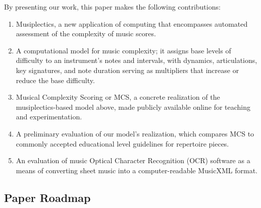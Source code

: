 \documentclass[10pt,preprint]{sigplanconf}
\begin{document}

By presenting our work, this paper makes the following contributions:

\begin{enumerate}
\item Musiplectics, a new application of computing that encompasses automated assessment of the complexity of music scores.
\item A computational model for music complexity; it assigns base levels of difficulty to an instrument's notes and intervals, with dynamics, articulations, key signatures, and note duration serving as multipliers that increase or reduce the base difficulty.
\item Musical Complexity Scoring or MCS, a concrete realization of the musiplectics-based model above, made publicly available online for teaching and experimentation.
\item A preliminary evaluation of our model's realization, which compares MCS to commonly accepted educational level guidelines for repertoire pieces.
\item An evaluation of music Optical Character Recognition (OCR) software as a means of converting sheet music into a computer-readable MusicXML format.
\end{enumerate}


\subsection{Paper Roadmap} 
\label{sec:layout}
\end{document}
